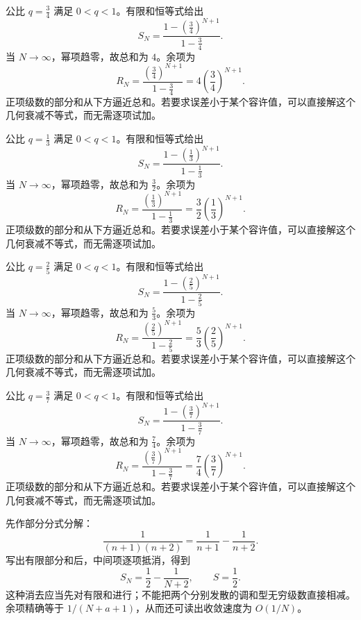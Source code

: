 \documentclass[12pt,fontset=fandol]{ctexart}
\begin{document}
\begin{solve}\label{ans:c24q3}
公比 $q=\frac{3}{4}$ 满足 $0<q<1$。有限和恒等式给出
\[
S_N=\frac{1-(\frac{3}{4})^{N+1}}{1-\frac{3}{4}}.
\]
当 $N\to\infty$，幂项趋零，故总和为 $4$。余项为
\[
R_N=\frac{(\frac{3}{4})^{N+1}}{1-\frac{3}{4}}=4(\frac{3}{4})^{N+1}.
\]
正项级数的部分和从下方逼近总和。若要求误差小于某个容许值，可以直接解这个几何衰减不等式，而无需逐项试加。
\end{solve}

\begin{solve}\label{ans:c24q4}
公比 $q=\frac{1}{3}$ 满足 $0<q<1$。有限和恒等式给出
\[
S_N=\frac{1-(\frac{1}{3})^{N+1}}{1-\frac{1}{3}}.
\]
当 $N\to\infty$，幂项趋零，故总和为 $\frac{3}{2}$。余项为
\[
R_N=\frac{(\frac{1}{3})^{N+1}}{1-\frac{1}{3}}=\frac{3}{2}(\frac{1}{3})^{N+1}.
\]
正项级数的部分和从下方逼近总和。若要求误差小于某个容许值，可以直接解这个几何衰减不等式，而无需逐项试加。
\end{solve}

\begin{solve}\label{ans:c24q5}
公比 $q=\frac{2}{5}$ 满足 $0<q<1$。有限和恒等式给出
\[
S_N=\frac{1-(\frac{2}{5})^{N+1}}{1-\frac{2}{5}}.
\]
当 $N\to\infty$，幂项趋零，故总和为 $\frac{5}{3}$。余项为
\[
R_N=\frac{(\frac{2}{5})^{N+1}}{1-\frac{2}{5}}=\frac{5}{3}(\frac{2}{5})^{N+1}.
\]
正项级数的部分和从下方逼近总和。若要求误差小于某个容许值，可以直接解这个几何衰减不等式，而无需逐项试加。
\end{solve}

\begin{solve}\label{ans:c24q6}
公比 $q=\frac{3}{7}$ 满足 $0<q<1$。有限和恒等式给出
\[
S_N=\frac{1-(\frac{3}{7})^{N+1}}{1-\frac{3}{7}}.
\]
当 $N\to\infty$，幂项趋零，故总和为 $\frac{7}{4}$。余项为
\[
R_N=\frac{(\frac{3}{7})^{N+1}}{1-\frac{3}{7}}=\frac{7}{4}(\frac{3}{7})^{N+1}.
\]
正项级数的部分和从下方逼近总和。若要求误差小于某个容许值，可以直接解这个几何衰减不等式，而无需逐项试加。
\end{solve}

\begin{solve}\label{ans:c24q7}
先作部分分式分解：
\[
\frac1{(n+1)(n+2)}=\frac1{n+1}-\frac1{n+2}.
\]
写出有限部分和后，中间项逐项抵消，得到
\[
S_N=\frac1{2}-\frac1{N+2},\qquad S=\frac{1}{2}.
\]
这种消去应当先对有限和进行；不能把两个分别发散的调和型无穷级数直接相减。余项精确等于 $1/(N+a+1)$，从而还可读出收敛速度为 $O(1/N)$。
\end{solve}
\end{document}
